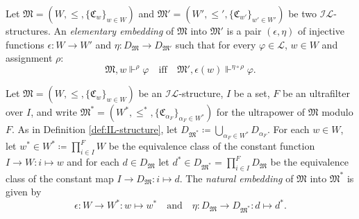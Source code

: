 \documentclass[submission,copyright,creativecommons]{eptcs}
\newcommand{\mc}{\mathcal}
\newcommand{\mo}{\mathfrak}
\renewcommand{\phi}{\varphi}
\renewcommand{\iff}{\quad\text{iff}\quad}
\newcommand{\IL}{\mathscr{I\!\!L}}   %
\newcommand{\satisfySym}{\Vdash}
\newcommand{\satisfy}[4]{#1, #2 \satisfySym^{#4} #3}
\begin{document}
\begin{definition}
  Let $\mo{M} = (W, \leq, \{ \mo{C}_{w} \}_{w \in W})$ and
  $\mo{M}' = (W', \leq', \{ \mo{C}_{w'} \}_{w' \in W'})$ be two $\IL$-structures.
  An \textit{elementary embedding} of $\mo{M}$ into $\mo{M'}$ is a pair
  $(\epsilon, \eta)$ of injective functions
  $\epsilon : W \to W'$ and $\eta : D_{\mo{M}} \to D_{\mo{M}'}$ such that
  for every $\phi \in \mc{L}$, $w \in W$ and assignment $\rho$:
  \begin{equation*}
    \satisfy{\mo{M}}{w}{\phi}{\rho}
      \iff \satisfy{\mo{M}'}{\epsilon(w)}{\phi}{\eta \circ \rho}.
  \end{equation*}
\end{definition}

\begin{definition}
  Let $\mo{M} = (W, \leq, \{ \mo{C}_w \}_{w \in W})$ be an $\IL$-structure,
  $I$ be a set, $F$ be an ultrafilter over $I$, and write
  $\mo{M}^* = (W^*, \leq^*, \{ \mo{C}_{\alpha_F} \}_{\alpha_F \in W^*})$
  for the ultrapower of $\mo{M}$ modulo $F$.
  As in Definition \ref{def:IL-structure}, let $D_{\mo{M}^*} \coloneq \bigcup_{\alpha_F \in W^*} D_{\alpha_F}$.
  For each $w \in W$, let $w^* \in W^* \coloneq \prod_{i \in I}^F W$ be the equivalence class of the
  constant function $I \to W : i \mapsto w$
  and for each $d \in D_{\mo{M}}$ let $d^* \in D_{\mo{M}^*} = \prod_{i \in I}^F D_{\mo{M}}$
  be the equivalence class of the constant map $I \to D_{\mo{M}} : i \mapsto d$.
  The \emph{natural embedding} of $\mo{M}$ into $\mo{M}^*$ is given by
  \begin{equation*}
    \epsilon : W \to W^* : w \mapsto w^*
    \quad\text{and}\quad
    \eta : D_{\mo{M}} \to D_{\mo{M}^*} : d \mapsto d^*.
  \end{equation*}
\end{definition}
\end{document}
